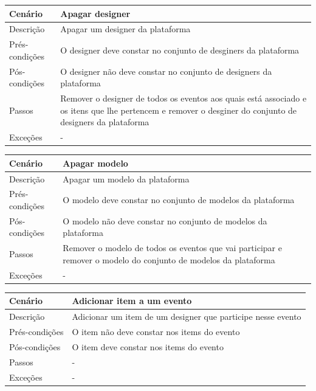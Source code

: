\documentclass{article}
\begin{document}
\begin{center}
\begin{tabular}{ |p{2.5cm}|p{9cm}| }
\hline
 Cenário & Apagar designer \\
\hline
Descrição & 	Apagar um designer da plataforma\\
\hline
 Prés-condições & O designer deve constar no conjunto de desginers da plataforma\\
\hline
Pós-condições & O designer não deve constar no conjunto de designers da plataforma\\
\hline
Passos &  Remover o designer de todos os eventos aos quais está associado e os itens que lhe pertencem e remover o desginer do conjunto de designers da plataforma\\
\hline
Exceções & -\\
\hline
\end{tabular}
\end{center}


\begin{center}
\begin{tabular}{ |p{2.5cm}|p{9cm}| }
\hline
 Cenário & Apagar modelo \\
\hline
Descrição & 	Apagar um modelo da plataforma\\
\hline
 Prés-condições & O modelo deve constar no conjunto de modelos da plataforma\\
\hline
Pós-condições & O modelo não deve constar no conjunto de modelos da plataforma\\
\hline
Passos &  Remover o modelo de todos os eventos que vai participar  e remover o modelo do conjunto de modelos da plataforma\\
\hline
Exceções & -\\
\hline
\end{tabular}
\end{center}


\begin{center}
\begin{tabular}{ |p{2.5cm}|p{9cm}| }
\hline
 Cenário & Adicionar item a um evento \\
\hline
Descrição & Adicionar um item de um designer que participe nesse evento\\
\hline
 Prés-condições & O item não deve constar nos items do evento\\
\hline
Pós-condições & O item deve constar nos items do evento\\
\hline
Passos &  - \\
\hline
Exceções & -\\
\hline
\end{tabular}
\end{center}
\end{document}
